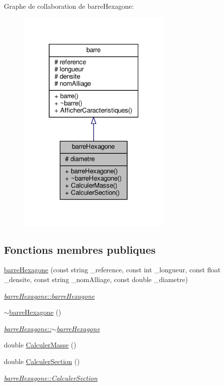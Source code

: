 Graphe de collaboration de barre\+Hexagone\+:
\nopagebreak
\begin{figure}[H]
\begin{center}
\leavevmode
\includegraphics[width=217pt]{classbarre_hexagone__coll__graph}
\end{center}
\end{figure}
\subsection*{Fonctions membres publiques}
\begin{DoxyCompactItemize}
\item 
\hyperlink{classbarre_hexagone_ae4c0f6eeac2af444aa99d6331916046d}{barre\+Hexagone} (const string \+\_\+reference, const int \+\_\+longueur, const float \+\_\+densite, const string \+\_\+nom\+Alliage, const double \+\_\+diametre)
\begin{DoxyCompactList}\small\item\em \hyperlink{classbarre_hexagone_ae4c0f6eeac2af444aa99d6331916046d}{barre\+Hexagone\+::barre\+Hexagone} \end{DoxyCompactList}\item 
\hyperlink{classbarre_hexagone_a525e2b1acce9f429ab4aad471b7e86da}{$\sim$barre\+Hexagone} ()
\begin{DoxyCompactList}\small\item\em \hyperlink{classbarre_hexagone_a525e2b1acce9f429ab4aad471b7e86da}{barre\+Hexagone\+::$\sim$barre\+Hexagone} \end{DoxyCompactList}\item 
double \hyperlink{classbarre_hexagone_a310610a3d03be6010899d1741a853b5b}{Calculer\+Masse} ()
\item 
double \hyperlink{classbarre_hexagone_a456a7b2330ae62eac9be943d6cfadeca}{Calculer\+Section} ()
\begin{DoxyCompactList}\small\item\em \hyperlink{classbarre_hexagone_a456a7b2330ae62eac9be943d6cfadeca}{barre\+Hexagone\+::\+Calculer\+Section} \end{DoxyCompactList}\end{DoxyCompactItemize}
